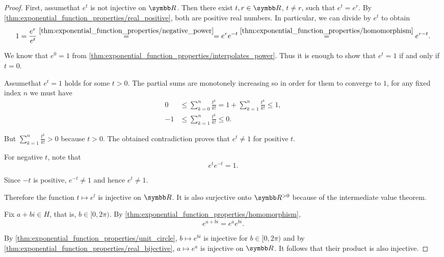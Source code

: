\begin{proof}
   First, assume\LEM that \( e^t \) is not injective on \( \R \). Then there exist \( t, r \in \R \), \( t \neq r \), such that \( e^t = e^r \). By \cref{thm:exponential_function_properties/real_positive}, both are positive real numbers. In particular, we can divide by \( e^t \) to obtain
  \begin{equation*}
    1
    =
    \frac {e^r} {e^t}
    \overset {\ref{thm:exponential_function_properties/negative_power}} =
    =
    e^r e^{-t}
    \overset {\ref{thm:exponential_function_properties/homomorphism}} =
    e^{r - t}.
  \end{equation*}

  We know that \( e^0 = 1 \) from \cref{thm:exponential_function_properties/interpolates_power}. Thus it is enough to show that \( e^t = 1 \) if and only if \( t = 0 \).

  Assume\LEM that \( e^t = 1 \) holds for some \( t > 0 \). The partial sums are monotonely increasing so in order for them to converge to \( 1 \), for any fixed index \( n \) we must have
  \begin{align*}
    0 &\leq \sum_{k=0}^n \frac {t^k} {k!} = 1 + \sum_{k=1}^n \frac {t^k} {k!} \leq 1,\\
    -1 &\leq \sum_{k=1}^n \frac {t^k} {k!} \leq 0.
  \end{align*}

  But \( \sum_{k=1}^n \frac {t^k} {k!} > 0 \) because \( t > 0 \). The obtained contradiction proves that \( e^t \neq 1 \) for positive \( t \).

  For negative \( t \), note that
  \begin{equation*}
    e^t e^{-t} = 1.
  \end{equation*}

  Since \( -t \) is positive, \( e^{-t} \neq 1 \) and hence \( e^t \neq 1 \).

  Therefore the function \( t \mapsto e^t \) is injective on \( \R \). It is also surjective onto \( \R^{>0} \) because of the intermediate value theorem.

   Fix \( a + bi \in H \), that is, \( b \in [0, 2\pi) \). By \cref{thm:exponential_function_properties/homomorphism},
  \begin{equation*}
    e^{a + bi} = e^a e^{bi}.
  \end{equation*}

  By \cref{thm:exponential_function_properties/unit_circle}, \( b \mapsto e^{bi} \) is injective for \( b \in [0, 2\pi) \) and by \cref{thm:exponential_function_properties/real_bijective}, \( a \mapsto e^a \) is injective on \( \R \). It follows that their product is also injective.


\end{proof}

